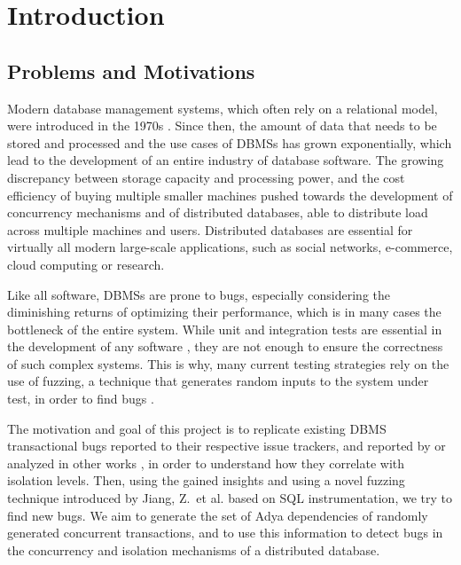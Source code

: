 \newcommand{\package}{\emph}

\chapter{Introduction}
\label{chap:introduction}
\section{Problems and Motivations}

Modern database management systems, which often rely on a relational model, were introduced in the 1970s \cite{codd1970relational}. Since then, the amount of data that needs to be stored and processed and the use cases of DBMSs has grown exponentially, which lead to the development of an entire industry of database software.
The growing discrepancy between storage capacity and processing power, and the cost efficiency of buying multiple smaller machines \cite{barroso2022datacenter} pushed towards the development of concurrency mechanisms and of distributed databases, able to distribute load across multiple machines and users. Distributed databases are essential for virtually all modern large-scale applications, such as social networks, e-commerce, cloud computing or research.

Like all software, DBMSs are prone to bugs, especially considering the diminishing returns of optimizing their performance, which is in many cases the bottleneck of the entire system. While unit and integration tests are essential in the development of any software \cite{testimblogtests}, they are not enough to ensure the correctness of such complex systems. This is why, many current testing strategies rely on the use of fuzzing, a technique that generates random inputs to the system under test, in order to find bugs \cite{liang2018fuzzing}.

The motivation and goal of this project is to replicate existing DBMS transactional bugs reported to their respective issue trackers, and reported by or analyzed in other works \cite{jiang2023detecting, cui2022differentially_ASE2022, dou2023detecting_ICSE2023, cui2024understanding_ICSE2024}, in order to understand how they correlate with isolation levels. Then, using the gained insights and using a novel fuzzing technique introduced by Jiang, Z.\ et al. \cite{jiang2023detecting} based on SQL instrumentation, we try to find new bugs. We aim to generate the set of Adya dependencies \cite{adya1999weak} of randomly generated concurrent transactions, and to use this information to detect bugs in the concurrency and isolation mechanisms of a distributed database.




